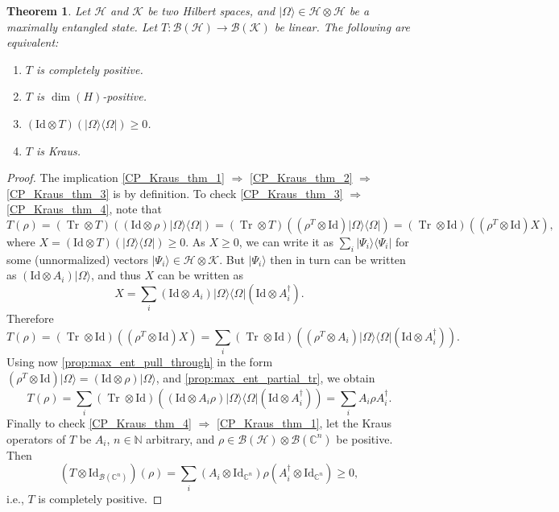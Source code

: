 \documentclass{article}
\newtheorem{theorem}{Theorem}
\theoremstyle{definition}
\newcommand{\tr}{\operatorname{Tr}}
\newcommand{\id}{\mathrm{Id}}
\newcommand{\ket}[1]{\vert #1 \rangle}
\newcommand{\bra}[1]{\langle #1 \vert}
\newcommand{\bounded}[1]{\mathcal{B}(#1)}
\begin{document}
\begin{theorem}
   Let $\mathcal{H}$ and $\mathcal{K}$ be two Hilbert spaces, and $\ket{\Omega}\in\mathcal{H}\otimes\mathcal{H}$ be a maximally entangled state. Let $T:\bounded{\mathcal{H}}\to\bounded{\mathcal{K}}$ be linear. The following are equivalent:
   \begin{enumerate}
        \item $T$ is completely positive. \label{CP_Kraus_thm_1}
        \item $T$ is $\dim(H)$-positive. \label{CP_Kraus_thm_2}
        \item $(\id\otimes T)(\ket{\Omega}\bra{\Omega}) \geq 0$. \label{CP_Kraus_thm_3} 
        \item $T$ is Kraus. \label{CP_Kraus_thm_4}
   \end{enumerate}
\end{theorem}
\begin{proof}
  The implication \ref{CP_Kraus_thm_1} $\Rightarrow$ \ref{CP_Kraus_thm_2} $\Rightarrow$ \ref{CP_Kraus_thm_3} is by definition. To check \ref{CP_Kraus_thm_3} $\Rightarrow$ \ref{CP_Kraus_thm_4}, note that 
  \begin{equation*}
    T(\rho) = (\tr \otimes T) ((\id \otimes \rho ) \ket{\Omega}\bra{\Omega}) = (\tr \otimes T) ((\rho^T \otimes \id ) \ket{\Omega}\bra{\Omega}) = (\tr\otimes \id) ((\rho^T \otimes \id) X),
  \end{equation*}
  where $X = (\id\otimes T)(\ket{\Omega}\bra{\Omega})\geq 0$. As $X\geq 0$, we can write it as $\sum_i \ket{\Psi_i}\bra{\Psi_i}$ for some (unnormalized) vectors $\ket{\Psi_i}\in \mathcal{H}\otimes\mathcal{K}$. But $\ket{\Psi_i}$ then in turn can be written as $(\id \otimes A_i)\ket{\Omega}$, and thus $X$ can be written as 
  \begin{equation*}
    X = \sum_i (\id \otimes A_i) \ket{\Omega}\bra{\Omega} (\id \otimes A_i^\dagger). 
  \end{equation*} 
  Therefore 
  \begin{equation*}
    T(\rho) = (\tr\otimes \id) ((\rho^T \otimes \id) X) = \sum_i (\tr \otimes\id) ((\rho^T \otimes A_i) \ket{\Omega}\bra{\Omega} (\id\otimes A_i^\dagger)).
  \end{equation*}
  Using now \cref{prop:max_ent_pull_through} in the form  $(\rho^T \otimes \id)\ket{\Omega} = (\id\otimes \rho) \ket{\Omega}$, and \cref{prop:max_ent_partial_tr}, we obtain 
  \begin{equation*}
    T(\rho) = \sum_i (\tr \otimes\id) ((\id\otimes A_i \rho) \ket{\Omega}\bra{\Omega} (\id\otimes A_i^\dagger)) = \sum_i A_i \rho A_i^\dagger.
  \end{equation*}
  Finally to check \ref{CP_Kraus_thm_4} $\Rightarrow$ \ref{CP_Kraus_thm_1}, let the Kraus operators of $T$ be $A_i$, $n\in\mathbb{N}$ arbitrary, and $\rho\in\bounded{\mathcal{H}}\otimes \bounded{\mathbb{C}^n}$ be positive. Then
    \begin{equation*}
      (T\otimes \id_{\bounded{\mathbb{C}^n}})(\rho) = \sum_i (A_i \otimes \id_{\mathbb{C}^n}) \rho (A_i^\dagger \otimes \id_{\mathbb{C}^n} ) \geq 0,
    \end{equation*}
    i.e., $T$ is completely positive.  
\end{proof}
\end{document}
